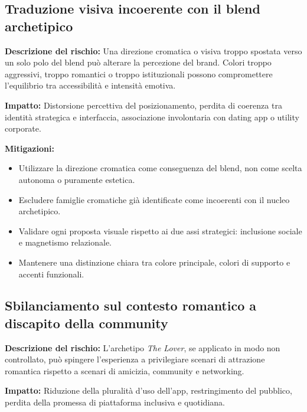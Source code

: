 \documentclass[a4paper, 11pt, table, dvipsnames]{article}
\begin{document}
\subsection{Traduzione visiva incoerente con il blend
      archetipico}

\textbf{Descrizione del rischio:} Una direzione cromatica o
visiva troppo spostata verso un solo polo del blend può alterare
la percezione del brand. Colori troppo aggressivi, troppo romantici
o troppo istituzionali possono compromettere l'equilibrio tra
accessibilità e intensità emotiva.

\textbf{Impatto:} Distorsione percettiva del
posizionamento, perdita di coerenza tra identità strategica
e interfaccia, associazione involontaria con dating app o
utility corporate.

\textbf{Mitigazioni:}
\begin{itemize}
      \item Utilizzare la direzione cromatica come conseguenza
            del blend, non come scelta autonoma o puramente
            estetica.

      \item Escludere famiglie cromatiche già identificate come
            incoerenti con il nucleo archetipico.

      \item Validare ogni proposta visuale rispetto ai due assi
            strategici: inclusione sociale e magnetismo
            relazionale.

      \item Mantenere una distinzione chiara tra colore principale,
            colori di supporto e accenti funzionali.
\end{itemize}

\subsection{Sbilanciamento sul contesto romantico a
      discapito della community}

\textbf{Descrizione del rischio:} L'archetipo \textit{The
      Lover}, se applicato in modo non controllato, può spingere
l'esperienza a privilegiare scenari di attrazione romantica
rispetto a scenari di amicizia, community e networking.

\textbf{Impatto:} Riduzione della pluralità d'uso dell'app,
restringimento del pubblico, perdita della promessa di piattaforma
inclusiva e quotidiana.
\end{document}
